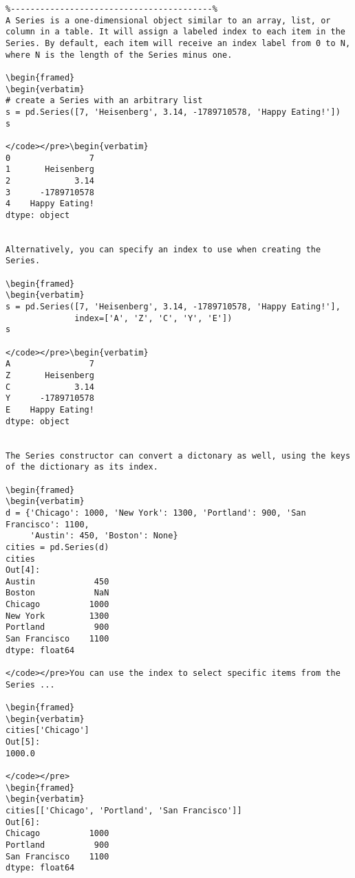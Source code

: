 \begin{itemize}
\begin{framed}
\begin{verbatim}
%-----------------------------------------%
A Series is a one-dimensional object similar to an array, list, or column in a table. It will assign a labeled index to each item in the Series. By default, each item will receive an index label from 0 to N, where N is the length of the Series minus one.

\begin{framed}
\begin{verbatim}
# create a Series with an arbitrary list
s = pd.Series([7, 'Heisenberg', 3.14, -1789710578, 'Happy Eating!'])
s

</code></pre>\begin{verbatim}
0                7
1       Heisenberg
2             3.14
3      -1789710578
4    Happy Eating!
dtype: object


Alternatively, you can specify an index to use when creating the Series.

\begin{framed}
\begin{verbatim}
s = pd.Series([7, 'Heisenberg', 3.14, -1789710578, 'Happy Eating!'],
              index=['A', 'Z', 'C', 'Y', 'E'])
s

</code></pre>\begin{verbatim}
A                7
Z       Heisenberg
C             3.14
Y      -1789710578
E    Happy Eating!
dtype: object


The Series constructor can convert a dictonary as well, using the keys of the dictionary as its index.

\begin{framed}
\begin{verbatim}
d = {'Chicago': 1000, 'New York': 1300, 'Portland': 900, 'San Francisco': 1100,
     'Austin': 450, 'Boston': None}
cities = pd.Series(d)
cities
Out[4]:
Austin            450
Boston            NaN
Chicago          1000
New York         1300
Portland          900
San Francisco    1100
dtype: float64

</code></pre>You can use the index to select specific items from the Series ...

\begin{framed}
\begin{verbatim}
cities['Chicago']
Out[5]:
1000.0

</code></pre>
\begin{framed}
\begin{verbatim}
cities[['Chicago', 'Portland', 'San Francisco']]
Out[6]:
Chicago          1000
Portland          900
San Francisco    1100
dtype: float64


\end{verbatim}
\end{framed}
\end{itemize}
